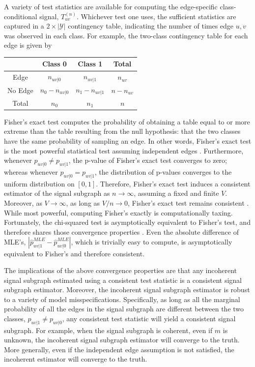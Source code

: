 \documentclass[10pt,journal,cspaper,compsoc]{IEEEtran}
\providecommand{\mc}[1]{\mathcal{#1}}
\providecommand{\mh}[1]{\hat{#1}}
\newcommand{\conv}{\rightarrow}
\begin{document}
A variety of test statistics are available for computing the edge-specific class-conditional signal, $T_{uv}^{(n)}$. Whichever test one uses, the sufficient statistics are captured in a $2 \times |\mc{Y}|$  contingency table, indicating the number of times edge $u,v$ was observed in each class.  For example, the two-class contingency table for each edge is given by

\begin{table}[h!]
\begin{center}
\begin{tabular}{c||c|c||c}
 & Class 0  & Class 1 & Total \\
\hline\hline
Edge & $n_{uv|0}$ & $n_{uv|1}$ & $n_{uv}$ \\ \hline
No Edge & $n_0-n_{uv|0}$ & $n_1-n_{uv|1}$ & $n-n_{uv}$ \\ \hline \hline
Total & $n_0$ & $n_1$ & $n$\\
\end{tabular}
\end{center}
\label{tab:fwpath}
\end{table}%

Fisher's exact test computes the probability of obtaining a table equal to or more extreme than the table resulting from the null hypothesis: that the two classes have the same probability of sampling an edge.  In other words, Fisher's exact test is the most powerful statistical test assuming independent edges \cite{Rice1995}.  Furthermore, whenever $p_{uv|0}\neq p_{uv|1}$, the p-value of Fisher's exact test converges to zero; whereas whenever $p_{uv|0}=p_{uv|1}$, the distribution of p-values converges to the uniform distribution on $[0,1]$.  Therefore, Fisher's exact test induces a consistent estimator of the signal subgraph as $n \conv \infty$, assuming a fixed and finite $V$.  Moreover, as $V \conv \infty$, as long as $V/n \conv 0$, Fisher's exact test remains consistent \cite{Rice1995}.  While most powerful, computing Fisher's exactly is computationally taxing.  Fortunately, the chi-squared test is asymptotically equivalent to Fisher's test, and therefore shares those convergence properties \cite{Rice1995}.  Even the absolute difference of MLE's, $|\mh{p}_{uv|1}^{MLE}-\mh{p}_{uv|0}^{MLE}|$, which is trivially easy to compute, is asymptotically equivalent to Fisher's \cite{Rice1995} and therefore consistent.

The implications of the above convergence properties are that any incoherent signal subgraph estimated using a consistent test statistic is a consistent signal subgraph estimator.  Moreover, the incoherent signal subgraph estimator is robust to a variety of model misspecifications.  Specifically, as long as all the marginal probability of all the edges in the signal subgraph are different between the two classes, $p_{uv|1}\neq p_{uv|0}$, any consistent test statistic will yield a consistent signal subgraph.  For example, when the signal subgraph is coherent, even if $m$ is unknown, the incoherent signal subgraph estimator will converge to the truth.  More generally, even if the independent edge assumption is not satisfied, the incoherent estimator will converge to the truth.
\end{document}
